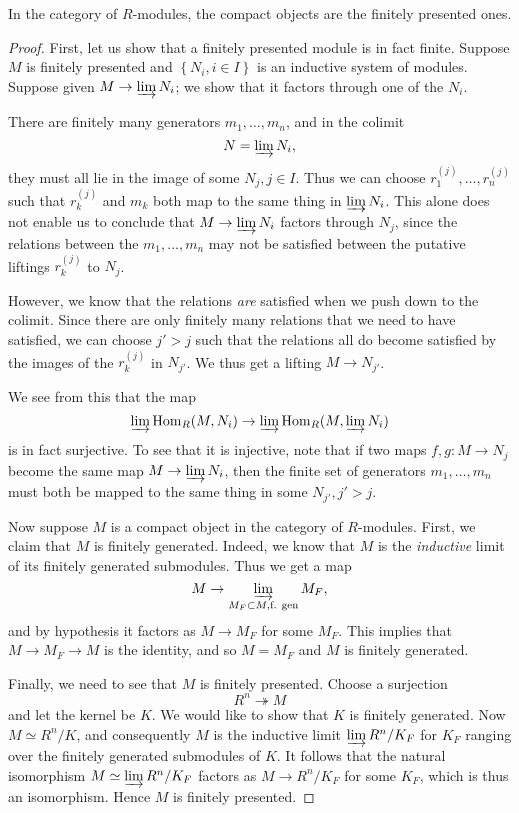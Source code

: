 \begin{proposition} \label{fpcompact}
In the category of $R$-modules, the compact objects are the finitely presented
ones.
\end{proposition} 
\begin{proof} 
First, let us show that a finitely presented module is in fact finite.
Suppose $M$ is finitely presented and $\left\{N_i, i \in I\right\}$ is an
inductive system of modules. Suppose given $M \to \varinjlim N_i$; we show
that it factors through one of the $N_i$.

There are finitely many generators $m_1, \dots,
m_n$, and in the colimit
\[ N = \varinjlim N_i , \]
they must all lie in the image of some $N_j, j \in I$. Thus we can choose
$r^{(j)}_1, \dots, r^{(j)}_n$ such that $r^{(j)}_k$ and $m_k$ both map to the
same thing in $\varinjlim N_i$.
This alone does not enable us to conclude that $M \to \varinjlim N_i$
factors through $N_j$, since the relations between the $m_1, \dots, m_n$ may not be
satisfied between the putative liftings $r^{(j)}_k$ to $N_j$. 

However, we know that the relations \emph{are} satisfied when we push down to
the colimit. Since there are  only finitely many relations that we need to
have satisfied, we can choose $j' > j$
such that the relations all do become satisfied by the images of the
$r^{(j)}_k$ in $N_{j'}$. We thus get a lifting $M \to N_{j'}$.

We see from this that the map
\[ \varinjlim \hom_R(M, N_i) \to \varinjlim \hom_R( M, \varinjlim N_i)  \]
is in fact surjective. To see that it is injective, note that if two maps $f,g:M
\to N_j$ become the same map $M \to \varinjlim N_i$, then the finite set of
generators $m_1, \dots, m_n$ must both be mapped to the same thing in some
$N_{j'}, j' > j$.

Now suppose $M$ is a compact object in the category of $R$-modules. 
First, we claim that $M$ is finitely generated. Indeed, we know that $M$ is
the \emph{inductive} limit of its finitely generated submodules.
Thus we get a map 
\[ M \to \varinjlim_{M_F \subset M, \text{f. gen}} M_F ,\]
and by hypothesis it factors as $M \to M_F$ for some $M_F$. This
implies that $M \to M_F \to M $ is the identity, and so $M = M_F$ and $M$ is
finitely generated.

Finally, we need to see that $M$ is finitely presented. Choose a surjection
\[ R^n \twoheadrightarrow M  \]
and let the kernel be $K$. We would like to show that $K$ is finitely
generated. Now $M \simeq R^n/K$, and consequently $M$ is the inductive limit
$\varinjlim R^n/ K_F$ for $K_F$ ranging over the finitely generated submodules
of $K$. It follows that the natural isomorphism $M \simeq \varinjlim R^n/K_F$
factors as $M \to R^n/K_F$ for some $K_F$, which is thus an isomorphism. Hence
$M$ is finitely presented.
\end{proof} 

